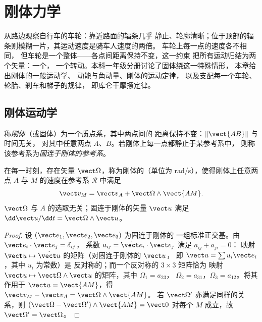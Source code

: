 \chapter{刚体力学}\label{ch:b2:rigid-body-mechanics}

从路边观察自行车的车轮：靠近路面的辐条几乎
静止、轮廓清晰；位于顶部的辐条则模糊一片，其运动速度是骑车人速度的两倍。
车轮上每一点的速度各不相同，
但车轮是一个整体——各点间距离保持不变，这一约束
把所有运动归结为两个矢量：一个，
一个转动。本科一年级分册讨论了固体绕这一特殊情形，
本章给出刚体的一般运动学、
动能与角动量、刚体的运动定律，
以及支配每一个车轮、轮胎、刹车和梯子的规律，
即库仑干摩擦定律。

\section{刚体运动学}

\begin{definition}[刚体]\label{def:b2:rigid-body-mechanics:solid}
称\emph{刚体}（或固体）为一个质点系，其中两点间的
距离保持不变：$\|\vect{AB}\|$ 与时间无关，
对其中任意两点 $A$、$B$。若刚体上每一点都静止于某参考系中，
则称该参考系为\emph{固连于刚体的参考系}。
\end{definition}

\begin{theorem}[刚体的速度场]\label{thm:b2:rigid-body-mechanics:field}
在每一时刻，存在矢量 $\vect\Omega$，称为刚体的\emph{}（单位为 \unit{rad/s}），使得刚体上任意两点
$A$ 与 $M$ 的速度在参考系 $\mathcal R$ 中满足
\[
\vect v_M = \vect v_A + \vect\Omega\wedge\vect{AM} .
\]
$\vect\Omega$ 与 $A$ 的选取无关；固连于刚体的矢量 $\vect u$
满足 $\dd\vect u/\dd t = \vect\Omega\wedge\vect u$。
\end{theorem}

\begin{proof}
设 $(\vect e_1, \vect e_2, \vect e_3)$ 为固连于刚体的
一组标准正交基。由 $\vect e_i\cdot\vect e_j = \delta_{ij}$，
系数 $a_{ij} = \dot{\vect e}_i\cdot\vect e_j$ 满足 $a_{ij} + a_{ji} = 0$：
映射 $\vect u \mapsto \dot{\vect u}$ 的矩阵（对固连于刚体的 $\vect u$，
即 $\vect u = \sum u_i\vect e_i$，其中 $u_i$ 为常数）是
反对称的；而一个反对称的 $3\times3$ 矩阵恰为
映射 $\vect u \mapsto \vect\Omega\wedge\vect u$ 的矩阵，其中 $\Omega_1 = a_{23}$，
$\Omega_2 = a_{31}$，$\Omega_3 = a_{12}$。将其作用于 $\vect u =
\vect{AM}$，得 $\vect v_M - \vect v_A = \vect\Omega\wedge\vect{AM}$。
若 $\vect\Omega'$ 亦满足同样的关系，则 $(\vect\Omega - \vect\Omega')\wedge
\vect{AM} = \vect 0$ 对每个 $M$ 成立，故 $\vect\Omega' = \vect\Omega$。
\end{proof}


